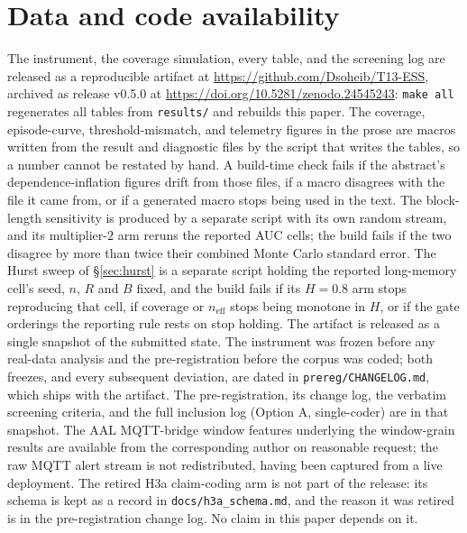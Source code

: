 \documentclass[a4paper,fleqn]{cas-dc}
\newcommand{\neff}{n_{\mathrm{eff}}}
\begin{document}
\section*{Data and code availability}
The instrument, the coverage simulation, every table, and the screening log are released as a
reproducible artifact at \url{https://github.com/Dsoheib/T13-ESS}, archived as release v0.5.0 at
\url{https://doi.org/10.5281/zenodo.24545243}: \texttt{make all} regenerates
all tables from \texttt{results/} and rebuilds this paper. The coverage, episode-curve, threshold-mismatch, and telemetry figures in the prose are
macros written from the result and diagnostic files by the script that writes the tables, so a
number cannot be restated by hand. A build-time check fails if the abstract's
dependence-inflation figures drift from those files, if a macro disagrees with the file it came
from, or if a generated macro stops being used in the text. The block-length sensitivity is
produced by a separate script with its own random stream, and its multiplier-$2$ arm reruns the
reported AUC cells; the build fails if the two disagree by more than twice their combined Monte
Carlo standard error. The Hurst sweep of \S\ref{sec:hurst} is a separate script holding the
reported long-memory cell's seed, $n$, $R$ and $B$ fixed, and the build fails if its $H{=}0.8$ arm
stops reproducing that cell, if coverage or $\neff$ stops being monotone in $H$, or if the gate
orderings the reporting rule rests on stop holding. The artifact is
released as a single snapshot of the submitted state. The instrument was frozen before any
real-data analysis and the pre-registration before the corpus was coded; both freezes, and every
subsequent deviation, are dated in \texttt{prereg/CHANGELOG.md}, which ships with the artifact. The
pre-registration, its change log, the verbatim screening criteria, and the full inclusion log
(Option A, single-coder) are in that snapshot.
The AAL MQTT-bridge window features underlying the window-grain results are available from the
corresponding author on reasonable request; the raw MQTT alert stream is not redistributed, having
been captured from a live deployment. The retired H3a claim-coding arm is not part of the release:
its schema is kept as a record in \texttt{docs/h3a\_schema.md}, and the reason it was retired is
in the pre-registration change log. No claim in this paper depends on it.
\end{document}
